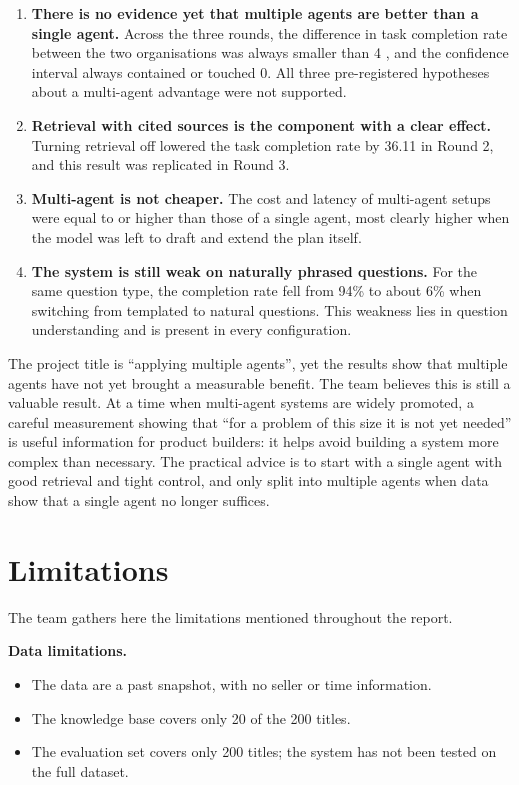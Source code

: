 \begin{enumerate}
    \item \textbf{There is no evidence yet that multiple agents are better than a single agent.} Across the three rounds, the difference in task completion rate between the two organisations was always smaller than 4 \pp{}, and the confidence interval always contained or touched 0. All three pre-registered hypotheses about a multi-agent advantage were not supported.

    \item \textbf{Retrieval with cited sources is the component with a clear effect.} Turning retrieval off lowered the task completion rate by 36.11 \pp{} in Round 2, and this result was replicated in Round 3.

    \item \textbf{Multi-agent is not cheaper.} The cost and latency of multi-agent setups were equal to or higher than those of a single agent, most clearly higher when the model was left to draft and extend the plan itself.

    \item \textbf{The system is still weak on naturally phrased questions.} For the same question type, the completion rate fell from 94\% to about 6\% when switching from templated to natural questions. This weakness lies in question understanding and is present in every configuration.
\end{enumerate}

The project title is ``applying multiple agents'', yet the results show that multiple agents have not yet brought a measurable benefit. The team believes this is still a valuable result. At a time when multi-agent systems are widely promoted, a careful measurement showing that ``for a problem of this size it is not yet needed'' is useful information for product builders: it helps avoid building a system more complex than necessary. The practical advice is to start with a single agent with good retrieval and tight control, and only split into multiple agents when data show that a single agent no longer suffices.

\section{Limitations}

The team gathers here the limitations mentioned throughout the report.

\textbf{Data limitations.}
\begin{itemize}
    \item The data are a past snapshot, with no seller or time information.
    \item The knowledge base covers only 20 of the 200 titles.
    \item The evaluation set covers only 200 titles; the system has not been tested on the full dataset.
\end{itemize}

